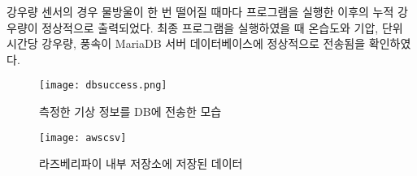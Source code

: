 강우량 센서의 경우 물방울이 한 번 떨어질 때마다 프로그램을 실행한 이후의 누적 강우량이 정상적으로 출력되었다. 최종 프로그램을 실행하였을 때 온습도와 기압, 단위 시간당 강우량, 풍속이 MariaDB 서버 데이터베이스에 정상적으로 전송됨을 확인하였다.

\begin{figure}[htbp]
	\centering
	\texttt{[image: dbsuccess.png]}
	\caption{측정한 기상 정보를 DB에 전송한 모습}
	\label{DBSENT}
\end{figure}

\begin{figure}[htbp]
	\centering
	\texttt{[image: awscsv]}
	\caption{라즈베리파이 내부 저장소에 저장된 데이터}
	\label{AWSCSV}
\end{figure}